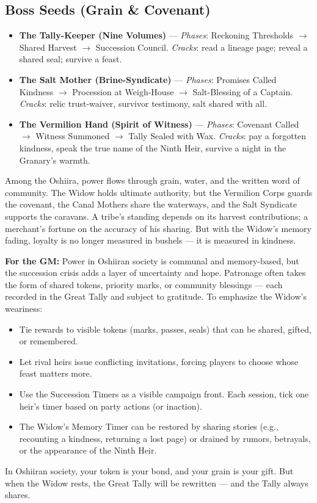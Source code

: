 \subsection*{Boss Seeds (Grain \& Covenant)}
\begin{itemize}
\item \textbf{The Tally-Keeper (Nine Volumes)} --- \emph{Phases}: Reckoning Thresholds $\rightarrow$ Shared Harvest $\rightarrow$ Succession Council. \emph{Cracks}: read a lineage page; reveal a shared seal; survive a feast.
\item \textbf{The Salt Mother (Brine-Syndicate)} --- \emph{Phases}: Promises Called Kindness $\rightarrow$ Procession at Weigh-House $\rightarrow$ Salt-Blessing of a Captain. \emph{Cracks}: relic trust-waiver, survivor testimony, salt shared with all.
\item \textbf{The Vermilion Hand (Spirit of Witness)} --- \emph{Phases}: Covenant Called $\rightarrow$ Witness Summoned $\rightarrow$ Tally Sealed with Wax. \emph{Cracks}: pay a forgotten kindness, speak the true name of the Ninth Heir, survive a night in the Granary's warmth.
\end{itemize}

\begin{tcolorbox}[colback=black!3,colframe=black!40!white,title={Patronage \& Power},breakable]
Among the Oshiira, power flows through grain, water, and the written word of community. The Widow holds ultimate authority, but the Vermilion Corps guards the covenant, the Canal Mothers share the waterways, and the Salt Syndicate supports the caravans. A tribe's standing depends on its harvest contributions; a merchant's fortune on the accuracy of his sharing. But with the Widow's memory fading, loyalty is no longer measured in bushels --- it is measured in kindness.

\textbf{For the GM:}  
Power in Oshiiran society is communal and memory-based, but the succession crisis adds a layer of uncertainty and hope. Patronage often takes the form of shared tokens, priority marks, or community blessings --- each recorded in the Great Tally and subject to gratitude. To emphasize the Widow's weariness:
\begin{itemize}
\item Tie rewards to visible tokens (marks, passes, seals) that can be shared, gifted, or remembered.
\item Let rival heirs issue conflicting invitations, forcing players to choose whose feast matters more.
\item Use the Succession Timers as a visible campaign front. Each session, tick one heir's timer based on party actions (or inaction).
\item The Widow's Memory Timer can be restored by sharing stories (e.g., recounting a kindness, returning a lost page) or drained by rumors, betrayals, or the appearance of the Ninth Heir.
\end{itemize}
In Oshiiran society, your token is your bond, and your grain is your gift. But when the Widow rests, the Great Tally will be rewritten --- and the Tally always shares.
\end{tcolorbox}

